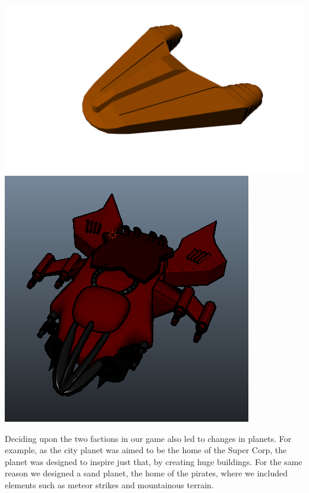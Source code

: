 \documentclass[11pt,a4paper]{article}
\begin{document}
\begin{center}
        \includegraphics[scale=0.2]{logos/file2.png}\\
        \includegraphics[scale=0.2]{logos/file11.png}\\
\end{center}

\noindent
        Deciding upon the two factions in our game also led to changes in planets. For example, as the city planet was aimed to be the home of the Super Corp, the planet was designed to inspire just that, by creating huge buildings. For the same reason we designed a sand planet, the home of the pirates, where we included elements such as meteor strikes and mountainous terrain. \\ \\
\end{document}
